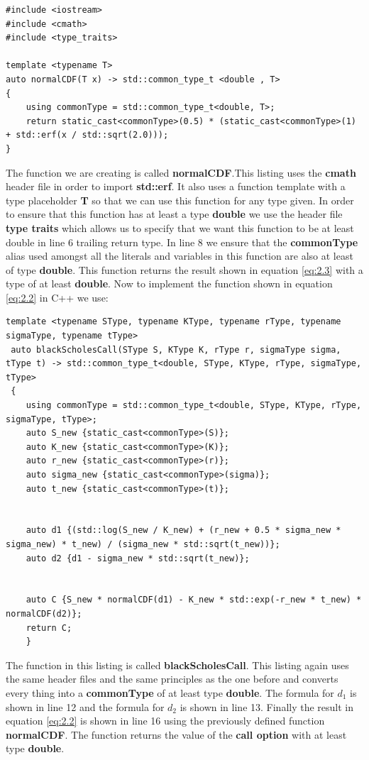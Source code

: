 \documentclass[12pt]{article}
\numberwithin{equation}{section}
\begin{document}
 \begin{lstlisting}[style=cpp]
#include <iostream>
#include <cmath>
#include <type_traits>
 
template <typename T>
auto normalCDF(T x) -> std::common_type_t <double , T>
{
	using commonType = std::common_type_t<double, T>;
	return static_cast<commonType>(0.5) * (static_cast<commonType>(1) + std::erf(x / std::sqrt(2.0)));
}
 \end{lstlisting}
 The function we are creating is called \textbf{normalCDF}.This listing uses the \textbf{cmath} header file in order to import \textbf{std::erf}. It also uses a function template with a type placeholder \textbf{T} so that we can use this function for any type given. In order to ensure that this function has at least a type \textbf{double} we use the header file \textbf{type traits} which allows us to specify that we want this function to be at least double in line 6 trailing return type. In line 8 we ensure that the \textbf{commonType} alias used amongst all the literals and variables in this function are also at least of type \textbf{double}. This function returns the result shown in equation \ref{eq:2.3} with a type of at least \textbf{double}. 
 \newpage
 Now to implement the function shown in equation \ref{eq:2.2} in C++ we use: 
 \begin{lstlisting}[style=cpp]
 template <typename SType, typename KType, typename rType, typename sigmaType, typename tType>
 auto blackScholesCall(SType S, KType K, rType r, sigmaType sigma, tType t) -> std::common_type_t<double, SType, KType, rType, sigmaType, tType>
 {
 	using commonType = std::common_type_t<double, SType, KType, rType, sigmaType, tType>;
 	auto S_new {static_cast<commonType>(S)};
 	auto K_new {static_cast<commonType>(K)};
 	auto r_new {static_cast<commonType>(r)};
 	auto sigma_new {static_cast<commonType>(sigma)};
 	auto t_new {static_cast<commonType>(t)};
 		
 		
 	auto d1 {(std::log(S_new / K_new) + (r_new + 0.5 * sigma_new * sigma_new) * t_new) / (sigma_new * std::sqrt(t_new))};
 	auto d2 {d1 - sigma_new * std::sqrt(t_new)};
 		
 		
 	auto C {S_new * normalCDF(d1) - K_new * std::exp(-r_new * t_new) * normalCDF(d2)};
 	return C;
 	}
 \end{lstlisting}
 The function in this listing is called \textbf{blackScholesCall}. This listing again uses the same header files and the same principles as the one before and converts every thing into a \textbf{commonType} of at least type \textbf{double}. The formula for $d_1$ is shown in line 12 and the formula for $d_2$ is shown in line 13.  Finally the result in equation \ref{eq:2.2} is shown in line 16 using the previously defined function \textbf{normalCDF}. The function returns the value of the \textbf{call option} with at least type \textbf{double}. 
 \newpage
\end{document}
